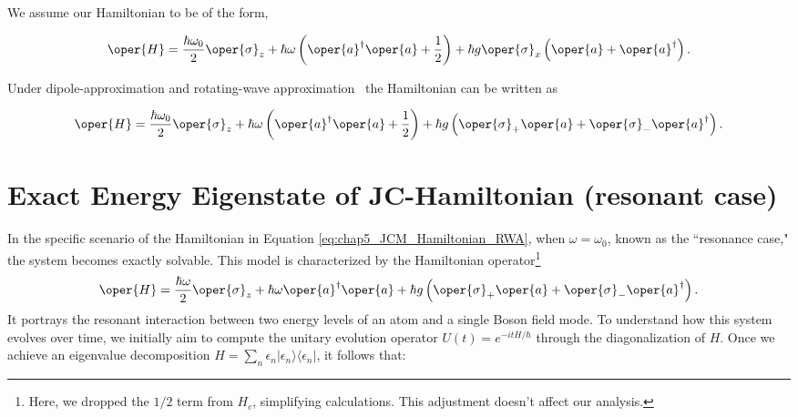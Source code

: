 We assume our Hamiltonian to be of the form,

\begin{mdframed}
\begin{eqnarray}
        \label{eq:chap5_JCM_Hamiltonian}
        \oper{H} = \frac{\hbar \omega_0}{2} \oper{\sigma}_z + \hbar \omega \left(\oper{a}^\dagger \oper{a} + \frac{1}{2}\right) 
        + \hbar g \oper{\sigma}_x\left(\oper{a} + \oper{a}^\dagger\right). 
\end{eqnarray}
\end{mdframed}


Under dipole-approximation and rotating-wave approximation~\cite[Chap 2]{Bina_JC_tutorial} the Hamiltonian can be written as
\begin{mdframed}
\begin{equation}
        \label{eq:chap5_JCM_Hamiltonian_RWA}
        \oper{H} = \frac{\hbar \omega_0}{2} \oper{\sigma}_z + \hbar \omega \left(\oper{a}^\dagger \oper{a} + \frac{1}{2}\right) 
        + \hbar g \left(\oper{\sigma}_+ \oper{a} + \oper{\sigma}_- \oper{a}^\dagger\right).
\end{equation}
\end{mdframed}

\section[Exact Energy Eigenstate of JC-Hamiltonian]{Exact Energy Eigenstate of JC-Hamiltonian (resonant case)}

In the specific scenario of the Hamiltonian in Equation \ref{eq:chap5_JCM_Hamiltonian_RWA}, when 
\(\omega  = \omega_0\), known as the 
``resonance case," the system becomes exactly solvable.
This model is characterized by the Hamiltonian operator\footnote{Here, we dropped the \(1/2\) term from \(H_c\), 
simplifying calculations. This adjustment doesn't affect our analysis.}
\begin{equation}
        \label{eq:chap5_JCM_Hamiltonian_resonance}
        \oper{H} = \frac{\hbar\omega}{2} \oper{\sigma}_z + \hbar \omega \oper{a}^\dagger \oper{a}
        + \hbar g \left(\oper{\sigma}_+ \oper{a} + \oper{\sigma}_- \oper{a}^\dagger\right). 
\end{equation}
It portrays the resonant interaction between two energy levels of an atom and a single Boson field mode.
To understand how this system evolves over time, we initially aim to compute the unitary evolution operator 
$U(t) = e^{-i t H/\hbar}$ through the diagonalization of $H$. Once we achieve an eigenvalue decomposition 
$H = \sum_n \epsilon_n \lvert \epsilon_n \rangle \langle \epsilon_n \rvert$, it follows that:

